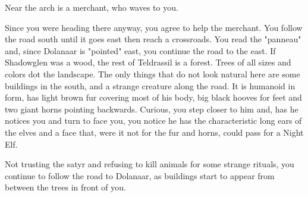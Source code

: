 
Near the arch is a merchant, who waves to you.


Since you were heading there anyway, you agree to help the merchant. You follow the road south until it goes east then reach a crossroads. You read the "panneau" and, since Dolanaar is "pointed" east, you continue the road to the east. If Shadowglen was a wood, the rest of Teldrassil is a forest. Trees of all sizes and colors dot the landscape. The only things that do not look natural here are some buildings in the south, and a strange creature along the road. It is humanoid in form, has light brown fur covering most of his body, big black hooves for feet and two giant horns pointing backwards. Curious, you step closer to him and, has he notices you and turn to face you, you notice he has the characteristic long ears of the elves and a face that, were it not for the fur and horns, could pass for a Night Elf.




Not trusting the satyr and refusing to kill animals for some strange rituals, you continue to follow the road to Dolanaar, as buildings start to appear from between the trees in front of you.

